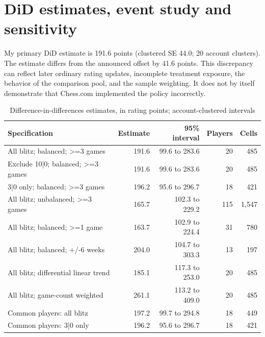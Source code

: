 \documentclass[11pt,a4paper]{article}
\begin{document}
\section{DiD estimates, event study and sensitivity}

My primary DiD estimate is 191.6 points (clustered SE 44.0; 20 account clusters). The estimate differs from the announced offset by 41.6 points. This discrepancy can reflect later ordinary rating updates, incomplete treatment exposure, the behavior of the comparison pool, and the sample weighting. It does not by itself demonstrate that Chess.com implemented the policy incorrectly.

\begin{table}[H]\centering\small\caption{Difference-in-differences estimates, in rating points; account-clustered intervals}\begin{tabular}{p{6.2cm}rrrr}\toprule

Specification & Estimate & 95\% interval & Players & Cells \\ \midrule

All blitz; balanced; >=3 games & 191.6 & 99.6 to 283.6 & 20 & 485 \\

Exclude 10|0; balanced; >=3 games & 191.6 & 99.6 to 283.6 & 20 & 485 \\

3|0 only; balanced; >=3 games & 196.2 & 95.6 to 296.7 & 18 & 421 \\

All blitz; unbalanced; >=3 games & 165.7 & 102.3 to 229.2 & 115 & 1,547 \\

All blitz; balanced; >=1 game & 163.7 & 102.9 to 224.4 & 31 & 780 \\

All blitz; balanced; +/-6 weeks & 204.0 & 104.7 to 303.3 & 13 & 197 \\

All blitz; differential linear trend & 185.1 & 117.3 to 253.0 & 20 & 485 \\

All blitz; game-count weighted & 261.1 & 113.2 to 409.0 & 20 & 485 \\

Common players: all blitz & 197.2 & 99.7 to 294.8 & 18 & 449 \\

Common players: 3|0 only & 196.2 & 95.6 to 296.7 & 18 & 421 \\

\bottomrule\end{tabular}\end{table}
\end{document}
